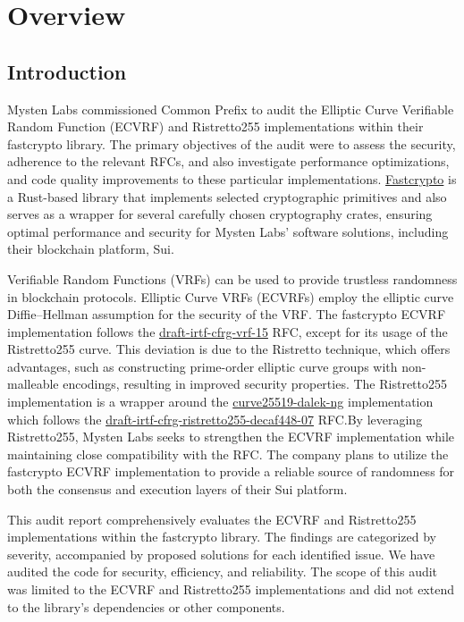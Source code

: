 \section{Overview}
\subsection{Introduction}
Mysten Labs commissioned Common Prefix to audit the Elliptic Curve Verifiable Random Function (ECVRF) and Ristretto255 implementations within their fastcrypto library. The primary objectives of the audit were to assess the security, adherence to the relevant RFCs, and also investigate performance optimizations, and code quality improvements to these particular implementations. \href{https://github.com/MystenLabs/fastcrypto}{Fastcrypto} is a Rust-based library that implements selected cryptographic primitives and also serves as a wrapper for several carefully chosen cryptography crates, ensuring optimal performance and security for Mysten Labs' software solutions, including their blockchain platform, Sui.

Verifiable Random Functions (VRFs) can be used to provide trustless randomness in blockchain protocols\cite{praos,algorand}. Elliptic Curve VRFs (ECVRFs) employ the elliptic curve Diffie--Hellman assumption for the security of the VRF\cite{vrf}. The fastcrypto ECVRF implementation follows the \href{https://datatracker.ietf.org/doc/draft-irtf-cfrg-vrf/}{draft-irtf-cfrg-vrf-15} RFC\cite{vrf-rfc}, except for its usage of the Ristretto255 curve. This deviation is due to the Ristretto technique, which offers advantages, such as constructing prime-order elliptic
curve groups with non-malleable encodings, resulting in improved security properties\cite{ristretto255-rfc}. The Ristretto255 implementation is a wrapper around the \href{https://github.com/zkcrypto/curve25519-dalek-ng}{curve25519-dalek-ng} implementation which follows the \href{https://datatracker.ietf.org/doc/draft-irtf-cfrg-ristretto255-decaf448/}{draft-irtf-cfrg-ristretto255-decaf448-07} RFC\cite{ristretto255-rfc}.By leveraging Ristretto255, Mysten Labs seeks to strengthen the ECVRF implementation while maintaining close compatibility with the RFC. The company plans to utilize the fastcrypto ECVRF implementation to provide a reliable source of randomness for both the consensus and execution layers of their Sui platform.

This audit report comprehensively evaluates the ECVRF and Ristret\-to255 implementations within the fastcrypto library. The findings are categorized by severity, accompanied by proposed solutions for each identified issue. We have audited the code for security, efficiency, and reliability. The scope of this audit was limited to the ECVRF and Ristretto255 implementations and did not extend to the library's dependencies or other components. 

